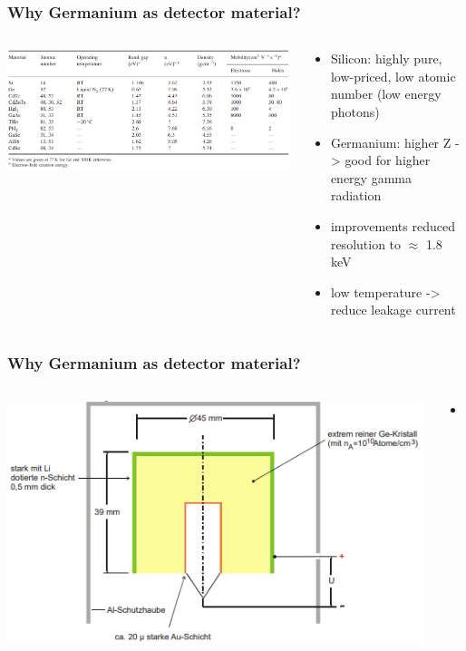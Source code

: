 \documentclass[aspectratio=1610, 9pt]{beamer}
\begin{document}
\begin{frame}\frametitle{Why Germanium as detector material?}
  \begin{columns}
    \begin{column}[c]{0.48\textwidth}
      \includegraphics[width=\textwidth]{plots/candidates.png}
    \end{column}
    \begin{column}[c]{0.48\textwidth}
      \begin{itemize}
        \item Silicon: highly pure, low-priced, low atomic number (low energy photons)
        \item Germanium: higher Z -> good for higher energy gamma radiation
        \item improvements reduced resolution to $\approx$ 1.8 keV
        \item low temperature -> reduce leakage current
      \end{itemize}
    \end{column}
  \end{columns}
\end{frame}

\begin{frame}\frametitle{Why Germanium as detector material?}
  \begin{columns}
    \begin{column}[c]{0.48\textwidth}
      \includegraphics[width=\textwidth]{plots/ge.png}
    \end{column}
    \begin{column}[c]{0.48\textwidth}
      \begin{itemize}
        \item
      \end{itemize}
    \end{column}
  \end{columns}
\end{frame}
\end{document}
